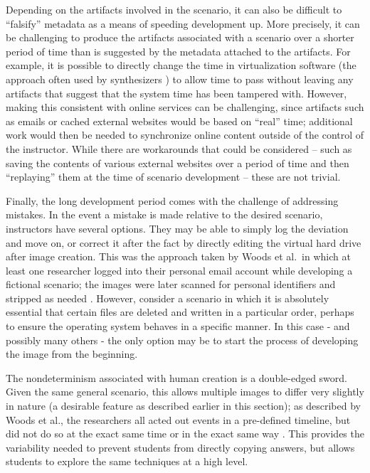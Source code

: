 \documentclass[letterpaper,12pt]{report}
\begin{document}
Depending on the artifacts involved in the scenario, it can also be
difficult to ``falsify'' metadata as a means of speeding development up.
More precisely, it can be challenging to produce the artifacts
associated with a scenario over a shorter period of time than is
suggested by the metadata attached to the artifacts. For example, it is
possible to directly change the time in virtualization software (the
approach often used by synthesizers
\cite{gobelForTraceHolisticForensic2022,mochForensicImageGenerator2009})
to allow time to pass without leaving any artifacts that suggest that
the system time has been tampered with. However, making this consistent
with online services can be challenging, since artifacts such as emails
or cached external websites would be based on ``real'' time; additional
work would then be needed to synchronize online content outside of the
control of the instructor. While there are workarounds that could be
considered -- such as saving the contents of various external websites
over a period of time and then ``replaying'' them at the time of
scenario development -- these are not trivial.

Finally, the long development period comes with the challenge of
addressing mistakes. In the event a mistake is made relative to the
desired scenario, instructors have several options. They may be able to
simply log the deviation and move on, or correct it after the fact by
directly editing the virtual hard drive after image creation. This was
the approach taken by Woods et al.~in which at least one researcher
logged into their personal email account while developing a fictional
scenario; the images were later scanned for personal identifiers and
stripped as needed \cite{woodsCreatingRealisticCorpora2011}.
However, consider a scenario in which it is absolutely essential that
certain files are deleted and written in a particular order, perhaps to
ensure the operating system behaves in a specific manner. In this case -
and possibly many others - the only option may be to start the process
of developing the image from the beginning.

The nondeterminism associated with human creation is a double-edged
sword. Given the same general scenario, this allows multiple images to
differ very slightly in nature (a desirable feature as described earlier
in this section); as described by Woods et al., the researchers all
acted out events in a pre-defined timeline, but did not do so at the
exact same time or in the exact same way
\cite{woodsCreatingRealisticCorpora2011}. This provides the
variability needed to prevent students from directly copying answers,
but allows students to explore the same techniques at a high level.
\end{document}
